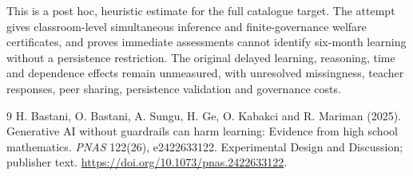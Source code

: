 \documentclass[11pt]{article}
\theoremstyle{remark}
\begin{document}
This is a post hoc, heuristic estimate for the full catalogue target.
The attempt gives classroom-level simultaneous inference and finite-governance welfare certificates, and proves immediate assessments cannot identify six-month learning without a persistence restriction. The original delayed learning, reasoning, time and dependence effects remain unmeasured, with unresolved missingness, teacher responses, peer sharing, persistence validation and governance costs.

\begin{thebibliography}{9}
 H. Bastani, O. Bastani, A. Sungu, H. Ge, O. Kabakci and R. Mariman (2025). Generative AI without guardrails can harm learning: Evidence from high school mathematics. \emph{PNAS} 122(26), e2422633122. Experimental Design and Discussion; publisher text. \url{https://doi.org/10.1073/pnas.2422633122}.
\end{thebibliography}
\end{document}
